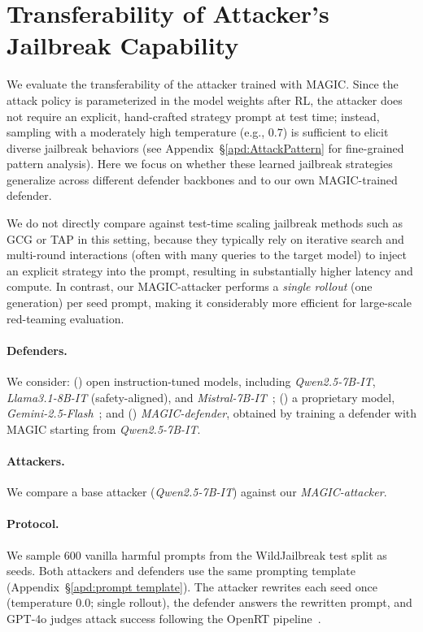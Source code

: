 \documentclass[11pt, letterpaper]{template}
\theoremstyle{plain}
\theoremstyle{definition}
\theoremstyle{remark}
\begin{document}
\section{Transferability of Attacker's Jailbreak Capability}\label{apx:attacker-capa}

We evaluate the transferability of the attacker trained with MAGIC. Since the attack policy is parameterized in the model weights after RL, the attacker does not require an explicit, hand-crafted strategy prompt at test time; instead, sampling with a moderately high temperature (e.g., $0.7$) is sufficient to elicit diverse jailbreak behaviors (see Appendix~\S\ref{apd:AttackPattern} for fine-grained pattern analysis). Here we focus on whether these learned jailbreak strategies generalize across different defender backbones and to our own MAGIC-trained defender.

We do not directly compare against test-time scaling jailbreak methods such as GCG or TAP in this setting, because they typically rely on iterative search and multi-round interactions (often with many queries to the target model) to inject an explicit strategy into the prompt, resulting in substantially higher latency and compute. In contrast, our MAGIC-attacker performs a \emph{single rollout} (one generation) per seed prompt, making it considerably more efficient for large-scale red-teaming evaluation.

\paragraph{Defenders.} We consider: () open instruction-tuned models, including \textit{Qwen2.5-7B-IT}, \textit{Llama3.1-8B-IT} (safety-aligned), and \textit{Mistral-7B-IT}~\citep{jiang2023mistral7b}; () a proprietary model, \textit{Gemini-2.5-Flash}~\citep{comanici2025gemini}; and () \textit{MAGIC-defender}, obtained by training a defender with MAGIC starting from \textit{Qwen2.5-7B-IT}.
\paragraph{Attackers.} We compare a base attacker (\textit{Qwen2.5-7B-IT}) against our \textit{MAGIC-attacker}.
\paragraph{Protocol.} We sample 600 vanilla harmful prompts from the WildJailbreak test split as seeds. Both attackers and defenders use the same prompting template (Appendix~\S\ref{apd:prompt template}). The attacker rewrites each seed once (temperature $0.0$; single rollout), the defender answers the rewritten prompt, and GPT-4o judges attack success following the OpenRT pipeline~\citep{OpenRT2026}.
\end{document}
